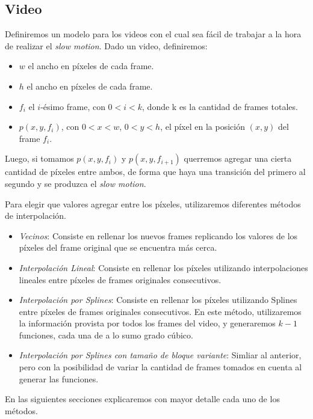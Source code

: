 \subsection{Video}

Definiremos un modelo para los videos con el cual sea fácil de trabajar a la hora de realizar
el \textit{slow motion}.
Dado un video, definiremos:
\begin{itemize}
    \item $w$ el ancho en píxeles de cada frame.
    \item $h$ el ancho en píxeles de cada frame.
    \item $f_i$ el $i$-ésimo frame, con $0< i < k$, donde k es la cantidad de frames totales.
    \item $p(x,y,f_i)$, con $0 < x < w$, $0< y < h$, el píxel en la posición $(x,y)$ del frame $f_i$.
\end{itemize}

Luego, si tomamos $p(x,y,f_i)$ y $p(x,y,f_{i+1})$ querremos agregar una cierta cantidad
de píxeles entre ambos, de forma que haya una transición del primero al segundo y
se produzca el \textit{slow motion}.

Para elegir que valores agregar entre los píxeles, utilizaremos diferentes métodos
de interpolación.
\begin{itemize}
    \item \textit{Vecinos}: Consiste en rellenar los nuevos frames replicando los
        valores de los píxeles del frame original que se encuentra más cerca.
    \item \textit{Interpolación Lineal}: Consiste en rellenar los píxeles utilizando
        interpolaciones lineales entre píxeles de frames originales consecutivos.
    \item \textit{Interpolación por Splines}: Consiste en rellenar los píxeles utilizando
        Splines entre píxeles de frames originales consecutivos. En este método,
        utilizaremos la información provista por todos los frames del video,
        y generaremos $k-1$ funciones, cada una de a lo sumo grado cúbico.
    \item \textit{Interpolación por Splines con tamaño de bloque variante}:
        Simliar al anterior, pero con la posibilidad de variar la cantidad de frames
        tomados en cuenta al generar las funciones.
\end{itemize}

En las siguientes secciones explicaremos con mayor detalle cada uno de los métodos.

